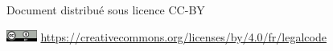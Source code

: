 \hspace{-1cm}\textcolor{inrae}{\sffamily \insertdate}\par

\vspace*{1cm}

\hspace{-1cm}\textcolor{inraefonce}{\sffamily \insertauthor}\par

\hspace{-1cm}\textcolor{inraefonce}{\sffamily
Document distribué sous licence CC-BY}\par

\hspace{-1cm}\includegraphics[width=1cm]{templates/cc-by} \href{https://creativecommons.org/licenses/by/4.0/fr/legalcode}{https://creativecommons.org/licenses/by/4.0/fr/legalcode}

\restoregeometry

